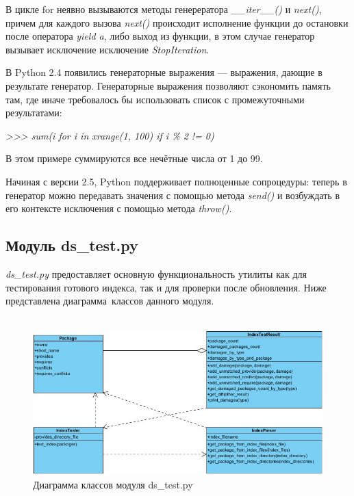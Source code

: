 В цикле for неявно вызываются методы генерератора \textit{\_\_iter\_\_()} и \textit{next()},
причем для каждого вызова \textit{next()} происходит исполнение функции до остановки после 
оператора \textit{yield a}, либо выход из функции, в этом случае генератор 
вызывает исключение исключение \textit{StopIteration}.

В Python 2.4 появились генераторные выражения — выражения, дающие в результате генератор. 
Генераторные выражения позволяют сэкономить память там, где иначе требовалось бы использовать список с промежуточными результатами:

\textit{ >>> sum(i for i in xrange(1, 100) if i \% 2 != 0)}

В этом примере суммируются все нечётные числа от 1 до 99.

Начиная с версии 2.5, Python поддерживает полноценные сопроцедуры: теперь в генератор можно передавать значения 
с помощью метода \textit{send()} и возбуждать в его контексте исключения с помощью метода \textit{throw()}.

\subsection{Модуль ds\_test.py}
\textit{ds\_test.py} предоставляет основную функциональность утилиты  как для тестирования
готового индекса, так и для проверки после обновления. Ниже представлена диаграмма~классов данного модуля.\\
\\
\begin{figure}[!ht]
\begin{center}
\includegraphics[scale=0.6, clip]{../resources/uml/ds_test_class_diagram.jpg}
\caption{Диаграмма классов модуля ds\_test.py}
\label{gr:dstestclassdiag}
\end{center}
\end{figure}

